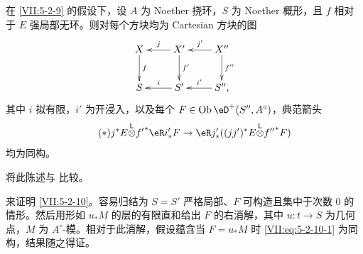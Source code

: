 \begin{proposition}\label{VII:5-2-10}
在 \ref{VII:5-2-9} 的假设下，设 $A$ 为 Noether 挠环，$S$ 为 Noether 概形，且 $f$ 相对于 $E$ 强局部无环。则对每个方块均为 Cartesian 方块的图
\[\xymatrix{
  X \ar[d]^-f
    & \ar[l]_-j X' \ar[d]^-{f'}
    & \ar[l]_-{j'} X'' \ar[d]^-{f''} \\
  S
    & \ar[l]_-i S'
    & \ar[l]_-{i'} S'' \text{,}
}\]
其中 $i$ 拟有限，$i'$ 为开浸入，以及每个 $F\in\ob\eD^+(S'',A^\circ)$，典范箭头
\begin{equation*}\tag{$*$}\label{VII:eq:5-2-10-1}
  j^\ast E \lotimes {f'}^\ast \eR i'_\ast F \to \eR j'_\ast ((j j')^\ast E\lotimes {f''}^\ast F)
\end{equation*}
均为同构。
\end{proposition}

将此陈述与 \cite[XV 1.17]{sga4} 比较。

来证明 \ref{VII:5-2-10}。容易归结为 $S=S'$ 严格局部、$F$ 可构造且集中于次数 $0$ 的情形。然后用形如 $u_\ast M$ 的层的有限直和给出 $F$ 的右消解，其中 $u:t\to S$ 为几何点，$M$ 为 $A^\circ$-模。相对于此消解，假设蕴含当 $F=u_\ast M$ 时 \eqref{VII:eq:5-2-10-1} 为同构，结果随之得证。
